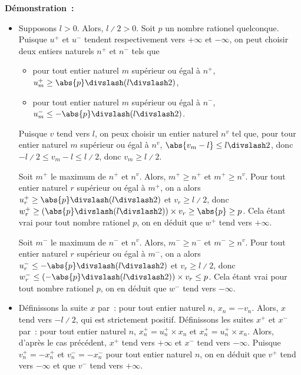 \noindent\textbf{Démonstration :} 
\begin{itemize}[nosep]
    \item Supposons $l > 0$.
        Alors, $l \divslash 2 > 0$.
        Soit $p$ un nombre rationel quelconque. 
        Puisque $u^+$ et $u^-$ tendent respectivement vers $+\infty$ et $-\infty$, on peut choisir deux entiers naturels $n^+$ et $n^-$ tels que
        \begin{itemize}[nosep]
            \item pour tout entier naturel $m$ supérieur ou égal à $n^+$, $u^+_m \geq \abs{p} \divslash (l \divslash 2)$,
            \item pour tout entier naturel $m$ supérieur ou égal à $n^-$, $u^-_m \leq -\abs{p} \divslash (l \divslash 2)$.
        \end{itemize}
        Puisque $v$ tend vers $l$, on peux choisir un entier naturel $n^v$ tel que, pour tour entier naturel $m$ supérieur ou égal à $n^v$, $\abs{v_m - l} \leq l \divslash 2$, donc $-l \divslash 2 \leq v_m - l \leq l \divslash 2$, donc $v_m \geq l \divslash 2$.
        
        Soit $m^+$ le maximum de $n^+$ et $n^v$. 
        Alors, $m^+ \geq n^+$ et $m^+ \geq n^v$.
        Pour tout entier naturel $r$ supérieur ou égal à $m^+$, on a alors $u^+_r \geq \abs{p} \divslash (l \divslash 2)$ et $v_r \geq l \divslash 2$, donc $w^+_r \geq \left( \abs{p} \divslash (l \divslash 2)\right) \times v_r \geq \abs{p} \geq p$. 
        Cela étant vrai pour tout nombre rationel $p$, on en déduit que $w^+$ tend vers $+\infty$.

        Soit $m^-$ le maximum de $n^-$ et $n^v$. 
        Alors, $m^- \geq n^-$ et $m^- \geq n^v$.
        Pour tout entier naturel $r$ supérieur ou égal à $m^-$, on a alors $u^-_r \leq -\abs{p} \divslash (l \divslash 2)$ et $v_r \geq l \divslash 2$, donc $w^-_r \leq \left( - \abs{p} \divslash (l \divslash 2)\right) \times v_r \leq p$. 
        Cela étant vrai pour tout nombre rationel $p$, on en déduit que $w^-$ tend vers $-\infty$.

    \item Définissons la suite $x$ par : pour tout entier naturel $n$, $x_n = -v_n$.
        Alors, $x$ tend vers $- l \divslash 2$, qui est strictement positif.
        Définissons les suites $x^+$ et $x^-$ par : pour tout entier naturel $n$, $x^+_n = u^+_n \times x_n$ et $x^+_n = u^+_n \times x_n$.
        Alors, d'après le cas précédent, $x^+$ tend vers $+\infty$ et $x^-$ tend vers $-\infty$.
        Puisque $v^+_n = - x^+_n$ et $v^-_n = - x^-_ n$ pour tout entier naturel $n$, on en déduit que $v^+$ tend vers $-\infty$ et que $v^-$ tend vers $+\infty$.
\end{itemize}

